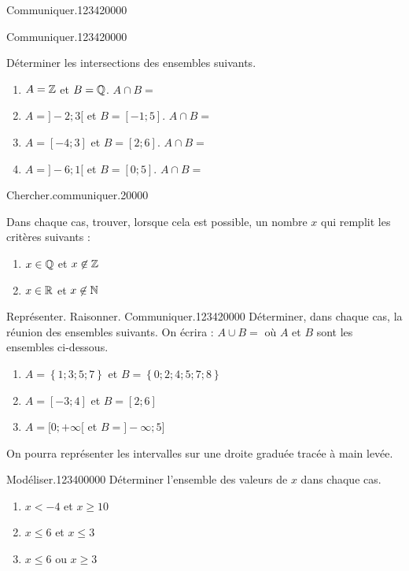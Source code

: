\begin{pageParcoursu}
\begin{ExoCu}{Communiquer.}{1234}{2}{0}{0}{0}{0}
\end{ExoCu}

\begin{ExoCu}{Communiquer.}{1234}{2}{0}{0}{0}{0}

Déterminer les intersections des ensembles suivants.
\begin{enumerate}
\item $A = \mathbb Z$ et $B = \mathbb Q$. $A \cap B = $ 
\item $A = ]-2;3[$ et $B =[-1;5]$. $A \cap B = $ 
\item $A = [-4;3]$ et $B =[2;6]$. $A \cap B = $ 
\item $A = ]-6;1[$ et $B =[0;5]$. $A \cap B = $ 
\end{enumerate}
\end{ExoCu}

\begin{ExoCu}{Chercher.communiquer.}{2}{0}{0}{0}{0}
 
Dans chaque cas, trouver, lorsque cela est possible, un nombre $x$ qui remplit les critères suivants :
\begin{enumerate}
\item $x \in \mathbb Q$ et $x \not\in \mathbb Z$ 
\item $x \in \mathbb R$ et $x \not\in \mathbb N$ 
\end{enumerate}
\end{ExoCu}

\begin{ExoCu}{Représenter. Raisonner. Communiquer.}{1234}{2}{0}{0}{0}{0}
Déterminer, dans chaque cas, la réunion des ensembles suivants. On écrira : $A \cup B = $ où $A$ et $B$ sont les ensembles ci-dessous.
\begin{enumerate}
\item $A=\left\lbrace 1;3;5;7  \right\rbrace $ et $B=\left\lbrace 0;2;4;5;7;8  \right\rbrace $
\item $A=[-3;4]$ et $B=[2;6]$
\item $A=[0;+\infty[$ et $B=]-\infty;5]$
\end{enumerate}
On pourra représenter les intervalles sur une droite graduée tracée à main levée.\end{ExoCu}

\begin{ExoCu}{Modéliser.}{1234}{0}{0}{0}{0}{0}
Déterminer l'ensemble des valeurs de $x$ dans chaque cas.
\begin{enumerate}
\item $x < -4$ et $x \geq 10$
\item $x \leq 6$ et $x \leq 3$
\item $x \leq 6$ ou $x \geq 3$
\end{enumerate} 
\end{ExoCu}


\end{pageParcoursu} %
 
